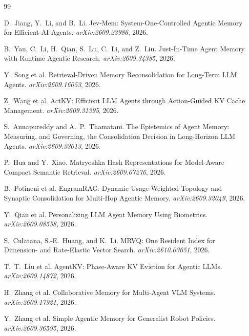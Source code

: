\documentclass[11pt,a4paper]{article}
\begin{document}
\begin{thebibliography}{99}

 D.~Jiang, Y.~Li, and B.~Li.
\newblock Jev-Mem: System-One-Controlled Agentic Memory for Efficient AI Agents.
\newblock \emph{arXiv:2609.23986}, 2026.

 B.~Yan, C.~Li, H.~Qian, S.~Lu, C.~Li, and Z.~Liu.
\newblock Just-In-Time Agent Memory with Runtime Agentic Research.
\newblock \emph{arXiv:2609.34385}, 2026.

 Y.~Song et al.
\newblock Retrieval-Driven Memory Reconsolidation for Long-Term LLM Agents.
\newblock \emph{arXiv:2609.16053}, 2026.

 Z.~Wang et al.
\newblock ActKV: Efficient LLM Agents through Action-Guided KV Cache Management.
\newblock \emph{arXiv:2609.31395}, 2026.

 S.~Annapureddy and A.~P.~Thamatani.
\newblock The Epistemics of Agent Memory: Measuring, and Governing, the
Consolidation Decision in Long-Horizon LLM Agents.
\newblock \emph{arXiv:2609.33013}, 2026.

 P.~Hua and Y.~Xiao.
\newblock Matryoshka Hash Representations for Model-Aware Compact Semantic Retrieval.
\newblock \emph{arXiv:2609.07276}, 2026.

 B.~Potineni et al.
\newblock EngramRAG: Dynamic Usage-Weighted Topology and Synaptic Consolidation
for Multi-Hop Agentic Memory.
\newblock \emph{arXiv:2609.32049}, 2026.

 Y.~Qian et al.
\newblock Personalizing LLM Agent Memory Using Biometrics.
\newblock \emph{arXiv:2609.08558}, 2026.

 S.~Culatana, S.-E.~Huang, and K.~Li.
\newblock MRVQ: One Resident Index for Dimension- and Rate-Elastic Vector Search.
\newblock \emph{arXiv:2610.03651}, 2026.

 T.~T.~Liu et al.
\newblock AgentKV: Phase-Aware KV Eviction for Agentic LLMs.
\newblock \emph{arXiv:2609.14872}, 2026.

 H.~Zhang et al.
\newblock Collaborative Memory for Multi-Agent VLM Systems.
\newblock \emph{arXiv:2609.17921}, 2026.

 Y.~Zhang et al.
\newblock Simple Agentic Memory for Generalist Robot Policies.
\newblock \emph{arXiv:2609.36595}, 2026.


\end{thebibliography}
\end{document}
